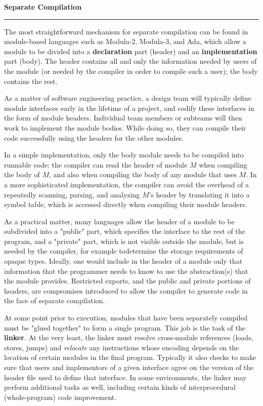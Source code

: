 \nopagenumbers
{\bf Separate Compilation}
\vskip 1mm
\hrule

\vskip 6pt
The most straightforward mechanism for separate compilation can be found in module-based languages such as Modula-2, Modula-3, and Ada, which allow a module to be divided into a {\bf declaration} part (header) and an {\bf implementation} part (body). The header contains all and only the information needed by users of the module (or needed by the compiler in order to compile such a user); the body contains the rest.

\vskip 6pt
As a matter of software engineering practice, a design team will typically define module interfaces early in the lifetime of a project, and codify these interfaces in the form of module headers. Individual team members or subteams will then work to implement the module bodies. While doing so, they can compile their code successfully using the headers for the other modules.

\vskip 6pt
In a simple implementation, only the body module needs to be compiled into runnable code: the compiler can read the header of module $M$ when compiling the body of $M$, and also when compiling the body of any module that uses $M$. In a more sophisticated implementation, the compiler can avoid the overhead of a repeatedly scanning, parsing, and analyzing $M$'s header by translating it into a symbol table, which is accessed directly when compiling their module headers.

\vskip 6pt
As a practical matter, many languages allow the header of a module to be subdivided into a "public" part, which specifies the interface to the rest of the program, and a "private" part, which is not visible outside the module, but is needed by the compiler, for example todetermine the storage requirements of opaque types. Ideally, one would include in the header of a module only that information that the programmer needs to know to use the abstraction(s) that the module provides. Restricted exports, and the public and private portions of headers, are compromises introduced to allow the compiler to generate code in the face of separate compilation.

\vskip 6pt
At some point prior to execution, modules that have been separately compiled must be "glued together" to form a single program. This job is the task of the {\bf linker}. At the very least, the linker must resolve cross-module references (loads, stores, jumps) and {\it relocate} any instructions whose encoding depends on the location of certain modules in the final program. Typically it also checks to make sure that users and implementors of a given interface agree on the version of the header file used to define that interface. In some environments, the linker may perform additional tasks as well, including certain kinds of interprocedural (whole-program) code improvement.


\vfill\eject
\bye
